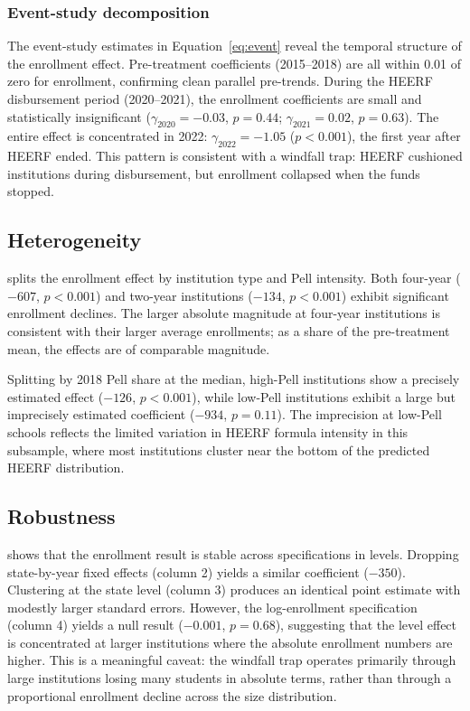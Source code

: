 \documentclass[12pt]{article}
\begin{document}
\subsubsection*{Event-study decomposition} The event-study estimates in Equation~\ref{eq:event} reveal the temporal structure of the enrollment effect. Pre-treatment coefficients (2015--2018) are all within 0.01 of zero for enrollment, confirming clean parallel pre-trends. During the HEERF disbursement period (2020--2021), the enrollment coefficients are small and statistically insignificant ($\gamma_{2020} = -0.03$, $p = 0.44$; $\gamma_{2021} = 0.02$, $p = 0.63$). The entire effect is concentrated in 2022: $\gamma_{2022} = -1.05$ ($p < 0.001$), the first year after HEERF ended. This pattern is consistent with a windfall trap: HEERF cushioned institutions during disbursement, but enrollment collapsed when the funds stopped.

\subsection{Heterogeneity}



 splits the enrollment effect by institution type and Pell intensity. Both four-year ($-607$, $p < 0.001$) and two-year institutions ($-134$, $p < 0.001$) exhibit significant enrollment declines. The larger absolute magnitude at four-year institutions is consistent with their larger average enrollments; as a share of the pre-treatment mean, the effects are of comparable magnitude.

Splitting by 2018 Pell share at the median, high-Pell institutions show a precisely estimated effect ($-126$, $p < 0.001$), while low-Pell institutions exhibit a large but imprecisely estimated coefficient ($-934$, $p = 0.11$). The imprecision at low-Pell schools reflects the limited variation in HEERF formula intensity in this subsample, where most institutions cluster near the bottom of the predicted HEERF distribution.

\subsection{Robustness}



 shows that the enrollment result is stable across specifications in levels. Dropping state-by-year fixed effects (column 2) yields a similar coefficient ($-350$). Clustering at the state level (column 3) produces an identical point estimate with modestly larger standard errors. However, the log-enrollment specification (column 4) yields a null result ($-0.001$, $p = 0.68$), suggesting that the level effect is concentrated at larger institutions where the absolute enrollment numbers are higher. This is a meaningful caveat: the windfall trap operates primarily through large institutions losing many students in absolute terms, rather than through a proportional enrollment decline across the size distribution.
\end{document}
